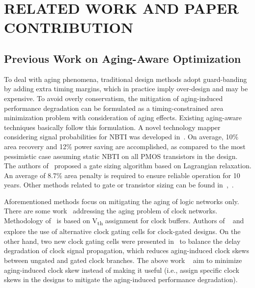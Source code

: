 \section{RELATED WORK AND PAPER CONTRIBUTION}
\label{sec:related}
\subsection{Previous Work on Aging-Aware Optimization}
\label{subsec:rw}
To deal with aging phenomena, traditional design methods adopt guard-banding by adding extra timing margins, which in practice imply over-design and may be expensive. To avoid overly conservatism, the mitigation of aging-induced performance degradation can be formulated as a timing-constrained area minimization problem with consideration of aging effects. Existing aging-aware techniques basically follow this formulation. A novel technology mapper considering signal probabilities for NBTI was developed in~\cite{kumar2007nbti}. On average, 10\% area recovery and 12\% power saving are accomplished, as compared to the most pessimistic case assuming static NBTI on all PMOS transistors in the design. The authors of~\cite{paul2006temporal} proposed a gate sizing algorithm based on Lagrangian relaxation. An average of 8.7\% area penalty is required to ensure reliable operation for 10 years. Other methods related to gate or transistor sizing can be found in~\cite{kang2007efficient},~\cite{yang2007combating}.

Aforementioned methods focus on mitigating the aging of logic networks only. There are some work~\cite{huang2013low, chakraborty2013skew,chen2013novel} addressing the aging problem of clock networks. Methodology of~\cite{chen2013novel} is based on V\textsubscript{th} assignment for clock buffers. Authors of ~\cite{huang2013low} and ~\cite{chakraborty2013skew} explore the use of alternative clock gating cells for clock-gated designs. On the other hand, two new clock gating cells were presented in~\cite{lai2014bti} to balance the delay degradation of clock signal propagation, which reduces aging-induced clock skews between ungated and gated clock branches. The above work ~\cite{huang2013low, chakraborty2013skew,chen2013novel,lai2014bti} aim to minimize aging-induced clock skew instead of making it useful (i.e., assign specific clock skews in the designs to mitigate the aging-induced performance degradation).

